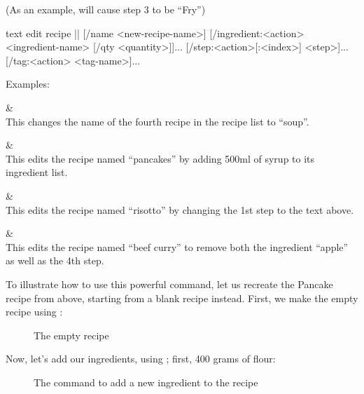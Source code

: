 	(As an example,  will cause step 3 to be \enquote{Fry})

	 \begin{blockofcode}{text}
		edit recipe |\itemref{}|
			[/name <new-recipe-name>]
			[/ingredient:<action> <ingredient-name> [/qty <quantity>]]...
			[/step:<action>[:<index>] <step>]...
			[/tag:<action> <tag-name>]...
	\end{blockofcode}

	Examples:
	\begin{bulletlist}
		&  \\
			This changes the name of the fourth recipe in the recipe list to \enquote{soup}.

		&  \\
			This edits the recipe named \enquote{pancakes} by adding 500ml of syrup to its ingredient list.

		&  \\
		  This edits the recipe named \enquote{risotto} by changing the 1st step to the text above.

		&  \\
		  This edits the recipe named \enquote{beef curry} to remove both the ingredient \enquote{apple} as well as the 4th step.
	\end{bulletlist}

	\pagebreak
	To illustrate how to use this powerful command, let us recreate the Pancake recipe from above, starting from a blank recipe instead. First, we make the empty recipe using :

	\vspace{-.5em} %
	\begin{figure}[!htbp]\centering\ContinuedFloat*
		\caption{The empty recipe}
	\end{figure}
	\vspace{-1.5em} %

	Now, let's add our ingredients, using ; first, 400 grams of flour:
	\begin{figure}[!htbp]\centering\ContinuedFloat
		\caption{The command to add a new ingredient to the recipe}
	\end{figure}


